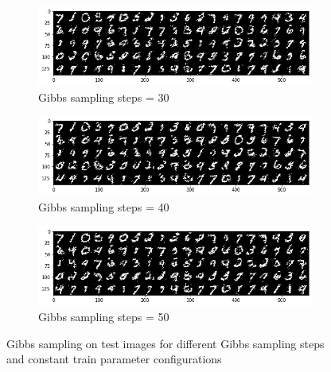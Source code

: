 \begin{figure}[ht]
	\begin{subfigure}[b]{0.33\textwidth}
		\centering
		\captionsetup{ width=1\linewidth, format = hang}
		\includegraphics[height = 0.5\textwidth, width = 1\textwidth]{Exercise4/Report/rbm_gibbs_30}
		\caption{Gibbs sampling steps = 30}\label{fig:rbm_gibbs_30}
	\end{subfigure}%
	\begin{subfigure}[b]{0.33\textwidth}
		\centering
		\captionsetup{width=1\linewidth, format = hang}
		\includegraphics[height = 0.5\textwidth, width = 1\textwidth]{Exercise4/Report/rbm_gibbs_40}
		\caption{Gibbs sampling steps = 40}\label{fig:rbm_gibbs_40}
	\end{subfigure}%
	\begin{subfigure}[b]{0.33\textwidth}
		\centering
		\captionsetup{width=1\linewidth, format = hang}
		\includegraphics[height = 0.5\textwidth,width = 1\textwidth]{Exercise4/Report/rbm_gibbs_50}
		\caption{Gibbs sampling steps = 50}\label{fig:rbm_gibbs_50}
	\end{subfigure}
	\captionsetup{format = hang}
	\caption{Gibbs sampling on test images for different Gibbs sampling steps and constant train parameter configurations}
	\label{fig:rbm_gibbs_dig}
\end{figure}\\
